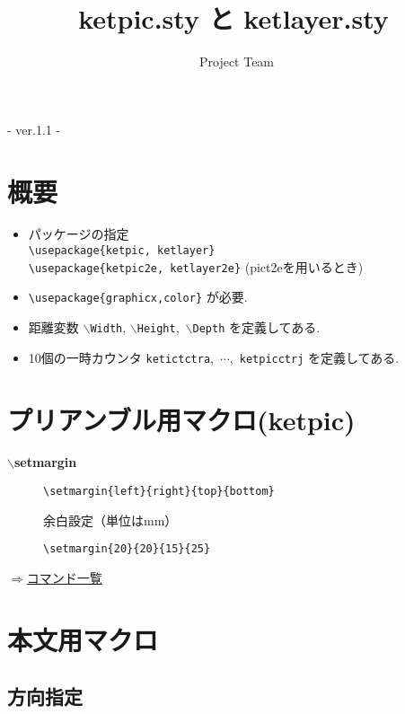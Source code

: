 \documentclass[a4j,12pt,dvipdfmx]{ujarticle}
\newcommand{\bs}{$\backslash$}
\newenvironment{cmd}[2]{%
\hypertarget{#2}{}
\begin{center}{\bf\large #1}\end{center}
\begin{description}
}{
\end{description}
\begin{flushright} \hyperlink{functionlist}{$\Rightarrow$コマンド一覧}\end{flushright}
}
\newcommand{\itemketj}[1]{
\item[\Ltab{15mm}{#1}]
}
\begin{document}
\title{{\bf\huge ketpic.sty と ketlayer.sty}}
\author{\ketcindy\ Project Team}
\maketitle

\begin{center}  - ver.1.1 -\end{center}


\section{概要}

\begin{itemize}
\item パッケージの指定\\
\quad\verb|\usepackage{ketpic, ketlayer}|\\
\quad\verb|\usepackage{ketpic2e, ketlayer2e}| (pict2eを用いるとき)
\item \verb|\usepackage{graphicx,color}| が必要.
\item 距離変数 \bs\verb|Width|, \bs\verb|Height|,\ \bs\verb|Depth| を定義してある.
\item 10個の一時カウンタ \verb|ketictctra|,\ $\cdots$,\ \verb|ketpicctrj| を定義してある.

\end{itemize}

\section{プリアンブル用マクロ(ketpic)}
\vspace{\baselineskip}
\begin{cmd}{\bs setmargin}{setmargin}
\itemketj{使用法}\verb|\setmargin{left}{right}{top}{bottom}|
\itemketj{説明}余白設定（単位はmm）
\itemketj{例}\verb|\setmargin{20}{20}{15}{25}|
\end{cmd}

\section{本文用マクロ}

\subsection{方向指定}
\end{document}

